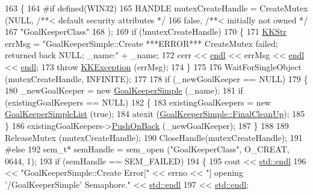 \begin{DoxyCode}
163 \{
164 \textcolor{preprocessor}{#if  defined(WIN32)}
165   HANDLE  mutexCreateHandle = CreateMutex (NULL,                 \textcolor{comment}{/**< default security attributes */}
166                                            \textcolor{keyword}{false},                \textcolor{comment}{/**< initially not owned */}
167                                            \textcolor{stringliteral}{"GoalKeeperClass"}
168                                           );
169   \textcolor{keywordflow}{if}  (!mutexCreateHandle)
170   \{
171     \hyperlink{class_k_k_b_1_1_k_k_str}{KKStr} errMsg = \textcolor{stringliteral}{"GoalKeeperSimple::Create   ***ERROR***   CreateMutex failed; returned back NULL; 
       \_name:"} + \_name;
172     cerr << \hyperlink{namespace_k_k_b_ad1f50f65af6adc8fa9e6f62d007818a8}{endl} << errMsg << \hyperlink{namespace_k_k_b_ad1f50f65af6adc8fa9e6f62d007818a8}{endl} << \hyperlink{namespace_k_k_b_ad1f50f65af6adc8fa9e6f62d007818a8}{endl};
173     \textcolor{keywordflow}{throw} \hyperlink{class_k_k_b_1_1_k_k_exception}{KKException} (errMsg);
174   \}
175 
176   WaitForSingleObject (mutexCreateHandle, INFINITE);
177 
178   \textcolor{keywordflow}{if}  (\_newGoalKeeper == NULL)
179   \{
180     \_newGoalKeeper = \textcolor{keyword}{new} \hyperlink{class_k_k_b_1_1_goal_keeper_simple}{GoalKeeperSimple} (\_name);
181     \textcolor{keywordflow}{if}  (existingGoalKeepers == NULL)
182     \{
183       existingGoalKeepers = \textcolor{keyword}{new} \hyperlink{class_k_k_b_1_1_goal_keeper_simple_list}{GoalKeeperSimpleList} (\textcolor{keyword}{true});
184       atexit (\hyperlink{class_k_k_b_1_1_goal_keeper_simple_a8b38fb338438be5de8e2aaa2ac3b227d}{GoalKeeperSimple::FinalCleanUp});
185     \}
186     existingGoalKeepers->\hyperlink{class_k_k_b_1_1_k_k_queue_aa9fba4632b54268bf71ecb42dee0b575}{PushOnBack} (\_newGoalKeeper);
187   \}
188 
189   ReleaseMutex (mutexCreateHandle);
190   CloseHandle(mutexCreateHandle);
191 \textcolor{preprocessor}{#else}
192   sem\_t*  semHandle = sem\_open (\textcolor{stringliteral}{"GoalKeeperClass"}, O\_CREAT, 0644, 1);
193   \textcolor{keywordflow}{if}  (semHandle == SEM\_FAILED)
194   \{
195     cout << \hyperlink{namespace_k_k_b_ad1f50f65af6adc8fa9e6f62d007818a8}{std::endl}
196          << \textcolor{stringliteral}{"GoalKeeperSimple::Create  Error["} << errno << \textcolor{stringliteral}{"] opening '/GoalKeeperSimple' Semaphore."} << 
      \hyperlink{namespace_k_k_b_ad1f50f65af6adc8fa9e6f62d007818a8}{std::endl}
197          << \hyperlink{namespace_k_k_b_ad1f50f65af6adc8fa9e6f62d007818a8}{std::endl};

\end{DoxyCode}
